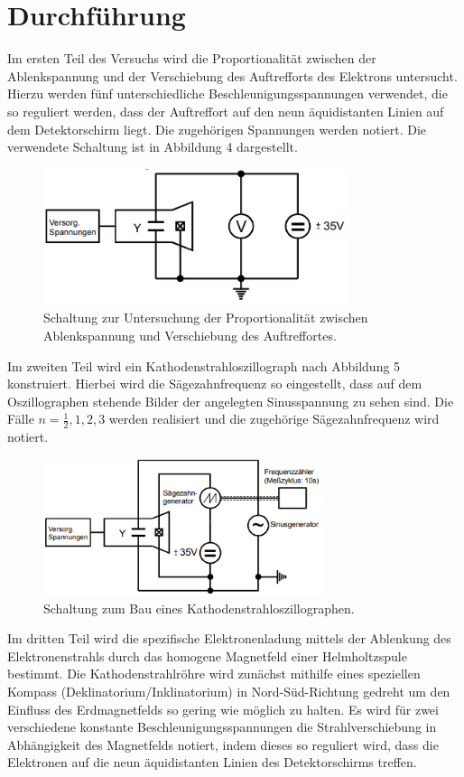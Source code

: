 \section{Durchführung}
\label{sec:Durchführung}

Im ersten Teil des Versuchs wird die Proportionalität zwischen der Ablenkspannung und der
Verschiebung des Auftrefforts des Elektrons untersucht. Hierzu werden fünf unterschiedliche
Beschleunigungsspannungen verwendet, die so reguliert werden, dass der Auftreffort auf den
neun äquidistanten Linien auf dem Detektorschirm liegt. Die zugehörigen Spannungen werden notiert.
Die verwendete Schaltung ist in Abbildung 4 dargestellt.
\begin{figure}[H]
  \centering
  \includegraphics[height=4cm]{schalt1.png}
  \caption{Schaltung zur Untersuchung der Proportionalität zwischen Ablenkspannung und Verschiebung des Auftreffortes. \cite[S.5]{kent}}
\end{figure}

Im zweiten Teil wird ein Kathodenstrahloszillograph nach Abbildung 5 konstruiert. Hierbei wird
die Sägezahnfrequenz so eingestellt, dass auf dem Oszillographen stehende Bilder der angelegten
Sinusspannung zu sehen sind. Die Fälle $n = \frac{1}{2}, 1, 2, 3$ werden realisiert und die
zugehörige Sägezahnfrequenz wird notiert.

\begin{figure}[H]
  \centering
  \includegraphics[height=4cm]{schalt2.png}
  \caption{Schaltung zum Bau eines Kathodenstrahloszillographen. \cite[S.5]{kent}}
\end{figure}

Im dritten Teil wird die spezifische Elektronenladung mittels der Ablenkung des Elektronenstrahls
durch das homogene Magnetfeld einer Helmholtzspule bestimmt. Die Kathodenstrahlröhre wird zunächst mithilfe
eines speziellen Kompass (Deklinatorium/Inklinatorium) in Nord-Süd-Richtung gedreht um den Einfluss
des Erdmagnetfelds so gering wie möglich zu halten. Es wird für zwei verschiedene konstante
Beschleunigungsspannungen die Strahlverschiebung in Abhängigkeit des Magnetfelds notiert, indem dieses
so reguliert wird, dass die Elektronen auf die neun äquidistanten Linien des Detektorschirms treffen.

